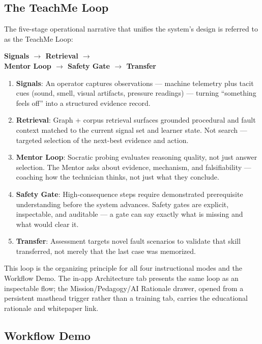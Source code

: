 \documentclass[10pt,letterpaper,twocolumn]{article}
\newcommand{\arrowto}{$\rightarrow$}
\begin{document}
\subsection{The TeachMe Loop}
\label{sec:teachme-loop}

The five-stage operational narrative that unifies the system's design is referred to as the TeachMe Loop:

\begin{center}
\normalsize\bfseries\sffamily\color{tmaccent} Signals \arrowto{} Retrieval \arrowto{} \\ Mentor Loop \arrowto{} Safety Gate \arrowto{} Transfer
\end{center}

\begin{enumerate}
  \item \textbf{Signals}: An operator captures observations --- machine telemetry plus tacit cues (sound, smell, visual artifacts, pressure readings) --- turning ``something feels off'' into a structured evidence record.
  \item \textbf{Retrieval}: Graph + corpus retrieval surfaces grounded procedural and fault context matched to the current signal set and learner state. Not search --- targeted selection of the next-best evidence and action.
  \item \textbf{Mentor Loop}: Socratic probing evaluates reasoning quality, not just answer selection. The Mentor asks about evidence, mechanism, and falsifiability --- coaching how the technician thinks, not just what they conclude.
  \item \textbf{Safety Gate}: High-consequence steps require demonstrated prerequisite understanding before the system advances. Safety gates are explicit, inspectable, and auditable --- a gate can say exactly what is missing and what would clear it.
  \item \textbf{Transfer}: Assessment targets novel fault scenarios to validate that skill transferred, not merely that the last case was memorized.
\end{enumerate}

This loop is the organizing principle for all four instructional modes and the Workflow Demo. The in-app Architecture tab presents the same loop as an inspectable flow; the Mission/Pedagogy/AI Rationale drawer, opened from a persistent masthead trigger rather than a training tab, carries the educational rationale and whitepaper link.

\subsection{Workflow Demo}
\label{sec:workflow-demo}
\end{document}
